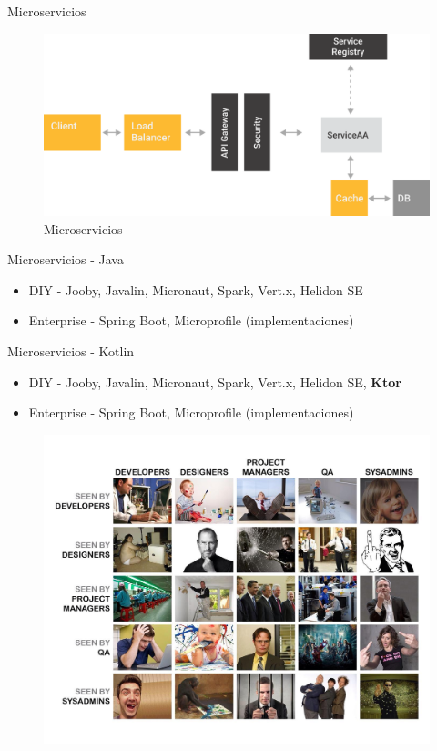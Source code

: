 \documentclass{beamer}
\begin{document}
\begin{frame}{Microservicios}
\begin{figure}
\centering
\includegraphics[width=\linewidth]{Images/microservicios}
\caption{Microservicios}
\end{figure}
\end{frame}

\begin{frame}{Microservicios - Java}
\begin{itemize}
	\item DIY - Jooby, Javalin, Micronaut, Spark, Vert.x, Helidon SE
	\item Enterprise - Spring Boot, Microprofile (implementaciones)
\end{itemize}
\end{frame}

\begin{frame}{Microservicios - Kotlin}
\begin{itemize}
	\item DIY - Jooby, Javalin, Micronaut, Spark, Vert.x, Helidon SE, \textbf{Ktor}
	\item Enterprise - Spring Boot, Microprofile (implementaciones)
\end{itemize}
\end{frame}


\begin{frame}{}
\begin{figure}
	\centering
	\includegraphics[width=\linewidth]{Images/people}
\end{figure}
\end{frame}
\end{document}
